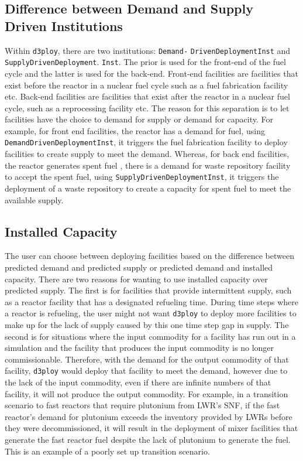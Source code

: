 \documentclass{anstrans}
\newcommand{\deploy}{\texttt{d3ploy}\xspace}%
\begin{document}
\subsection{\textbf{Difference between Demand and Supply Driven Institutions}}
Within \deploy, there are two institutions: \texttt{Demand-}
\texttt{DrivenDeploymentInst} and \texttt{SupplyDrivenDeployment}. 
\texttt{Inst}. 
The prior is used for the front-end of the fuel cycle and the latter is used 
for the back-end. 
Front-end facilities are facilities that exist before the reactor 
in a nuclear fuel cycle such as a fuel fabrication facility etc. 
Back-end facilities are facilities that exist after the reactor in a nuclear 
fuel cycle, such as a reprocessing facility etc. 
The reason for this separation is to let facilities have the choice 
to demand for supply or demand for capacity. 
For example, for front end facilities, the reactor has a demand for 
fuel, using \texttt{DemandDrivenDeploymentInst}, it triggers the fuel 
fabrication facility to deploy facilities to create supply to meet 
the demand. 
Whereas, for back end facilities, the reactor generates spent fuel 
, there is a demand for waste repository facility to accept the 
spent fuel, using \texttt{SupplyDrivenDeploymentInst}, it triggers the
deployment of a waste repository to create a capacity for spent fuel 
to meet the available supply. 

\subsection{\textbf{Installed Capacity}}
The user can choose between deploying facilities based on the difference 
between predicted demand and predicted supply or predicted demand and 
installed capacity. 
There are two reasons for wanting to use installed capacity over predicted 
supply. 
The first is for facilities that provide intermittent supply, such as a 
reactor facility that has a designated refueling time. 
During time steps where a reactor is refueling, the user might not 
want \deploy to deploy more facilities to make up for the lack of supply
caused by this one time step gap in supply. 
The second is for situations where the input commodity for a facility has
run out in a simulation and the facility that produces the input commodity 
is no longer commissionable. 
Therefore, with the demand for the output commodity of that facility, \deploy
would deploy that facility to meet the demand, however due to the lack of 
the input commodity, even if there are infinite numbers of that facility, 
it will not produce the output commodity. 
For example, in a transition scenario to fast reactors that require plutonium 
from \gls{LWR}'s \gls{SNF}, if the fast reactor's demand for plutonium exceeds
the inventory provided by \gls{LWR}s before they were decommissioned, it will 
result in the deployment of mixer facilities that generate the fast reactor 
fuel despite the lack of plutonium to generate the fuel. 
This is an example of a poorly set up transition scenario. 
\end{document}
